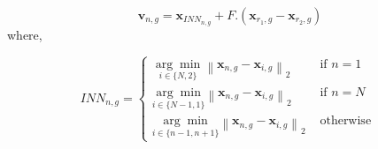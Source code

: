 \begin{equation}
\mathbf{v}_{n, g}=\mathbf{x}_{I N N_{n, g}}+F.\left(\mathbf{x}_{r_{1}, g}-\mathbf{x}_{r_{2}, g}\right)
\label{fINRAND1_equation}
\end{equation}
where,

$$
I N N_{n, g}=\left\{
\begin{array}{ll}
{\underset{i \in\{N, 2\}}{\arg \min} \left\|\mathbf{x}_{n, g}-\mathbf{x}_{i, g}\right\|_{2}} & {\text { if } n=1} \\
{\underset{i \in\{N-1,1\}}{\arg \min}\left\|\mathbf{x}_{n, g}-\mathbf{x}_{i, g}\right\|_{2}} & {\text { if } n=N} \\
{\underset{i \in\{n-1, n+1\}}{\arg \min}\left\|\mathbf{x}_{n, g}-\mathbf{x}_{i, g}\right\|_{2}} & {\text { otherwise }}
\end{array}
\right.
$$